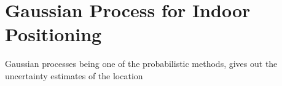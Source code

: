 \chapter{Gaussian Process for Indoor Positioning}

Gaussian processes being one of the probabilistic methods, gives out the uncertainty estimates of the location 



\clearpage